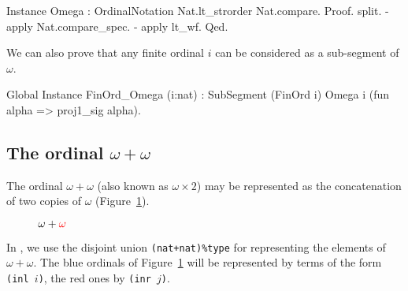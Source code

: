 \begin{Coqsrc}
Instance Omega : OrdinalNotation Nat.lt_strorder Nat.compare.
Proof.
 split.
 - apply Nat.compare_spec.
 - apply lt_wf.
Qed.
\end{Coqsrc}

We can also prove that any finite ordinal $i$ can be considered as a sub-segment of $\omega$.

\begin{Coqsrc}
Global Instance FinOrd_Omega (i:nat) :
  SubSegment (FinOrd i) Omega i 
             (fun alpha =>  proj1_sig alpha).
\end{Coqsrc}


\subsection{The ordinal \texorpdfstring{$\omega+\omega$}{omega + omega}}

The ordinal $\omega+\omega$ (also known as $\omega\times 2$) may be represented as the concatenation 
of two copies of $\omega$ (Figure~\ref{fig:omega-plus-omega}).

\begin{figure}[h]
   \centering
   \caption{\textcolor{blue}{$\omega+{\color{red}\omega}$}}
   \label{fig:omega-plus-omega}
 \end{figure}

In \coq{}, we use the disjoint union \texttt{(nat+nat)\%type} for representing the elements of $\omega+\omega$.
The blue ordinals of Figure~\ref{fig:omega-plus-omega} will be represented by terms of the form \texttt{(inl $i$)},
the red ones by \texttt{(inr $j$)}.

